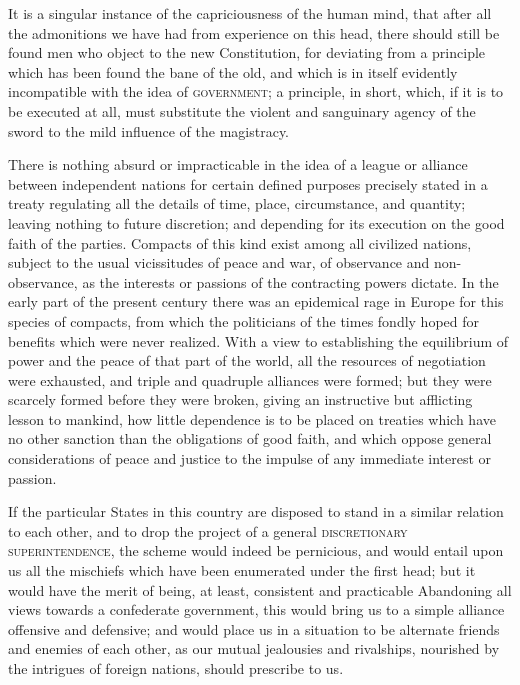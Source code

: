 It is a singular instance of the capriciousness of the human mind, that after all the admonitions we have had from experience on this head, there should still be found men who object to the new Constitution, for deviating from a principle which has been found the bane of the old, and which is in itself evidently incompatible with the idea of \textsc{government}; a principle, in short, which, if it is to be executed at all, must substitute the violent and sanguinary agency of the sword to the mild influence of the magistracy.

There is nothing absurd or impracticable in the idea of a league or alliance between independent nations for certain defined purposes precisely stated in a treaty regulating all the details of time, place, circumstance, and quantity; leaving nothing to future discretion; and depending for its execution on the good faith of the parties. Compacts of this kind exist among all civilized nations, subject to the usual vicissitudes of peace and war, of observance and non-observance, as the interests or passions of the contracting powers dictate. In the early part of the present century there was an epidemical rage in Europe for this species of compacts, from which the politicians of the times fondly hoped for benefits which were never realized. With a view to establishing the equilibrium of power and the peace of that part of the world, all the resources of negotiation were exhausted, and triple and quadruple alliances were formed; but they were scarcely formed before they were broken, giving an instructive but afflicting lesson to mankind, how little dependence is to be placed on treaties which have no other sanction than the obligations of good faith, and which oppose general considerations of peace and justice to the impulse of any immediate interest or passion.

If the particular States in this country are disposed to stand in a similar relation to each other, and to drop the project of a general \textsc{discretionary superintendence}, the scheme would indeed be pernicious, and would entail upon us all the mischiefs which have been enumerated under the first head; but it would have the merit of being, at least, consistent and practicable Abandoning all views towards a confederate government, this would bring us to a simple alliance offensive and defensive; and would place us in a situation to be alternate friends and enemies of each other, as our mutual jealousies and rivalships, nourished by the intrigues of foreign nations, should prescribe to us.


